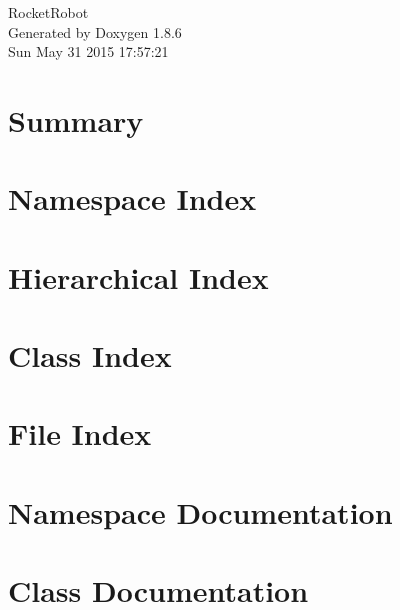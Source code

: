 \documentclass[twoside]{book}
\newcommand{\clearemptydoublepage}{%
  \newpage{\pagestyle{empty}\cleardoublepage}%
}
\begin{document}
\hypersetup{pageanchor=false}
\begin{titlepage}
\vspace*{7cm}
\begin{center}%
{\Large Rocket\-Robot }\\
\vspace*{1cm}
{\large Generated by Doxygen 1.8.6}\\
\vspace*{0.5cm}
{\small Sun May 31 2015 17:57:21}\\
\end{center}
\end{titlepage}
\clearemptydoublepage
\tableofcontents
\clearemptydoublepage
{}
\hypersetup{pageanchor=true}

\chapter{Summary}
\label{index}\hypertarget{index}{}
\chapter{Namespace Index}

\chapter{Hierarchical Index}

\chapter{Class Index}

\chapter{File Index}

\chapter{Namespace Documentation}



\chapter{Class Documentation}

















\end{document}
